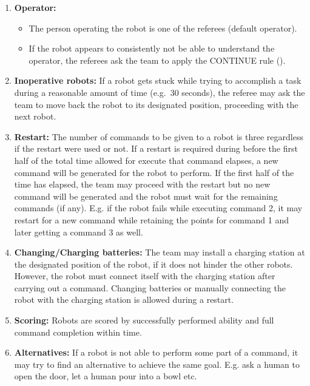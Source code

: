 \begin{enumerate}
	\item \textbf{Operator:}
	\begin{itemize}
		\item The person operating the robot is one of the referees (default operator).
		\item If the robot appears to consistently not be able to understand the operator, the referees ask the team to apply the CONTINUE rule ().
	\end{itemize}

	\item \textbf{Inoperative robots:} If a robot gets stuck while trying to accomplish a task during a reasonable amount of time (e.g.~30 seconds), the referee may ask the team to move back the robot to its designated position, proceeding with the next robot. \\

	\item \textbf{Restart:} The number of commands to be given to a robot is three regardless if the restart were used or not. 
	If a restart is required during before the first half of the total time allowed for execute that command elapses, a new command will be generated for the robot to perform. 
	If the first half of the time has elapsed, the team may proceed with the restart but no new command will be generated and the robot must wait for the remaining commands (if any).
	E.g.  if the robot fails while executing command 2, it may restart for a new command while retaining the points for command 1 and later getting a command 3 as well.\\

	\item \textbf{Changing/Charging batteries:} The team may install a charging station at the designated position of the robot, if it does not hinder the other robots. However, the robot must connect itself with the charging station after carrying out a command. Changing batteries or manually connecting the robot with the charging station is allowed during a restart. \\

	\item \textbf{Scoring:} Robots are scored by successfully performed ability and full command completion within time. 
	
	\item \textbf{Alternatives: } If a robot is not able to perform some part of a command, it may try to find an alternative to achieve the same goal. 
	  E.g. ask a human to open the door, let a human pour into a bowl etc. 
\end{enumerate}

